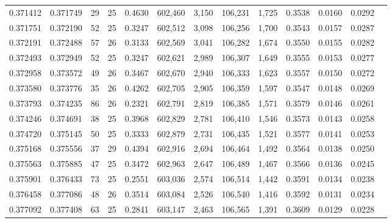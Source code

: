 \begin{tabular}{rrrrrrrrrrrrr}
0.371412 & 0.371749 &  29 &  25 &                                     0.4630 & 602,460 &   3,150 & 106,231 &   1,725 & 0.3538 & 0.0160 & 0.0292 \\
0.371751 & 0.372190 &  52 &  25 &                                     0.3247 & 602,512 &   3,098 & 106,256 &   1,700 & 0.3543 & 0.0157 & 0.0287 \\
0.372191 & 0.372488 &  57 &  26 &                                     0.3133 & 602,569 &   3,041 & 106,282 &   1,674 & 0.3550 & 0.0155 & 0.0282 \\
0.372493 & 0.372949 &  52 &  25 &                                     0.3247 & 602,621 &   2,989 & 106,307 &   1,649 & 0.3555 & 0.0153 & 0.0277 \\
0.372958 & 0.373572 &  49 &  26 &                                     0.3467 & 602,670 &   2,940 & 106,333 &   1,623 & 0.3557 & 0.0150 & 0.0272 \\
0.373580 & 0.373776 &  35 &  26 &                                     0.4262 & 602,705 &   2,905 & 106,359 &   1,597 & 0.3547 & 0.0148 & 0.0269 \\
0.373793 & 0.374235 &  86 &  26 &                                     0.2321 & 602,791 &   2,819 & 106,385 &   1,571 & 0.3579 & 0.0146 & 0.0261 \\
0.374246 & 0.374691 &  38 &  25 &                                     0.3968 & 602,829 &   2,781 & 106,410 &   1,546 & 0.3573 & 0.0143 & 0.0258 \\
0.374720 & 0.375145 &  50 &  25 &                                     0.3333 & 602,879 &   2,731 & 106,435 &   1,521 & 0.3577 & 0.0141 & 0.0253 \\
0.375168 & 0.375556 &  37 &  29 &                                     0.4394 & 602,916 &   2,694 & 106,464 &   1,492 & 0.3564 & 0.0138 & 0.0250 \\
0.375563 & 0.375885 &  47 &  25 &                                     0.3472 & 602,963 &   2,647 & 106,489 &   1,467 & 0.3566 & 0.0136 & 0.0245 \\
0.375901 & 0.376433 &  73 &  25 &                                     0.2551 & 603,036 &   2,574 & 106,514 &   1,442 & 0.3591 & 0.0134 & 0.0238 \\
0.376458 & 0.377086 &  48 &  26 &                                     0.3514 & 603,084 &   2,526 & 106,540 &   1,416 & 0.3592 & 0.0131 & 0.0234 \\
0.377092 & 0.377408 &  63 &  25 &                                     0.2841 & 603,147 &   2,463 & 106,565 &   1,391 & 0.3609 & 0.0129 & 0.0228 \\

\end{tabular}
